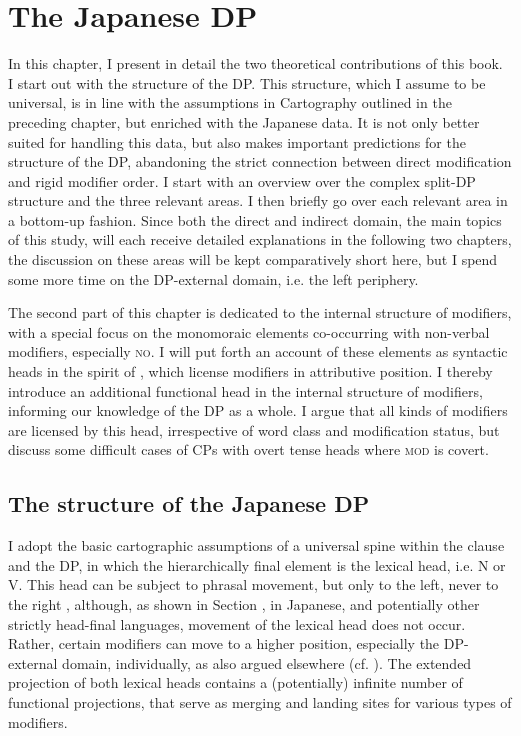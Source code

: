 \chapter{The Japanese DP} \label{theoreticalassumptions}

In this chapter, I present in detail the two theoretical contributions of this book. I start out with the structure of the DP. This structure, which I assume to be universal, is in line with the assumptions in Cartography outlined in the preceding chapter, but enriched with the Japanese data. It is not only better suited for handling this data, but also makes important predictions for the structure of the DP, abandoning the strict connection between direct modification and rigid modifier order. I start with an overview over the complex split-DP structure and the three relevant areas. I then briefly go over each relevant area in a bottom-up fashion. Since both the direct and indirect domain, the main topics of this study, will each receive detailed explanations in the following two chapters, the discussion on these areas will be kept comparatively short here, but I spend some more time on the DP-external domain, i.e. the left periphery.

The second part of this chapter is dedicated to the internal structure of modifiers, with a special focus on the monomoraic elements co-occurring with non-verbal modifiers, especially \textsc{no}. I will put forth an account of these elements as syntactic heads in the spirit of \citet{rubin:1993:category, rubin:1994:mod, rubin:1996:transparent}, which license modifiers in attributive position. I thereby introduce an additional functional head in the internal structure of modifiers, informing our knowledge of the DP as a whole. I argue that all kinds of modifiers are licensed by this head, irrespective of word class and modification status, but discuss some difficult cases of CPs with overt tense heads where \textsc{mod} is covert.

\section{The structure of the Japanese DP} \label{japanesedp}

I adopt the basic cartographic assumptions of a universal spine within the clause and the DP, in which the hierarchically final element is the lexical head, i.e. N or V. This head can be subject to phrasal movement, but only to the left, never to the right \citep{kayne:1994:anti, cinque:2005:deriving, cinque:2023:linearization}, although, as shown in Section , in Japanese, and potentially other strictly head-final languages, movement of the lexical head does not occur. Rather, certain modifiers can move to a higher position, especially the DP-external domain, individually, as also argued elsewhere (cf. \citealt{kim:2019:syntax, laenzlinger:2005:french, laenzlinger:2011:elements}). The extended projection of both lexical heads contains a (potentially) infinite number of functional projections, that serve as merging and landing sites for various types of modifiers.

